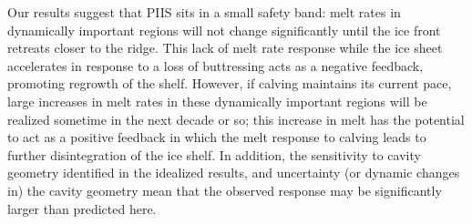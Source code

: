 \documentclass[draft]{agujournal2019}
\begin{document}
Our results suggest that PIIS sits in a small safety band: melt rates in dynamically important regions will not change significantly until the ice front retreats closer to the ridge. This lack of melt rate response while the ice sheet accelerates in response to a loss of buttressing acts as a negative feedback, promoting regrowth of the shelf. However, if calving maintains its current pace, large increases in melt rates in these dynamically important regions will be realized sometime in the next decade or so; this increase in melt has the potential to act as a positive feedback in which the melt response to calving leads to further disintegration of the ice shelf. In addition, the sensitivity to cavity geometry identified in the idealized results, and uncertainty (or dynamic changes in) the cavity geometry mean that the observed response may be significantly larger than predicted here. 



%
\end{document}
